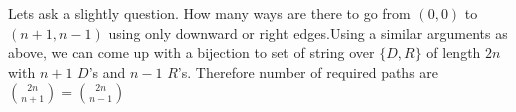 Lets ask a slightly question. How many ways are there to go from $(0,0)$ to $(n+1,n-1)$ using only downward or right edges.Using a similar arguments as above, we can come up with a bijection to set of string over $\{D,R\}$ of length $2n$ with $n+1$ $D$'s and $n-1$ $R$'s. Therefore number of required paths are $\binom{2n}{n+1}=\binom{2n}{n-1}$

